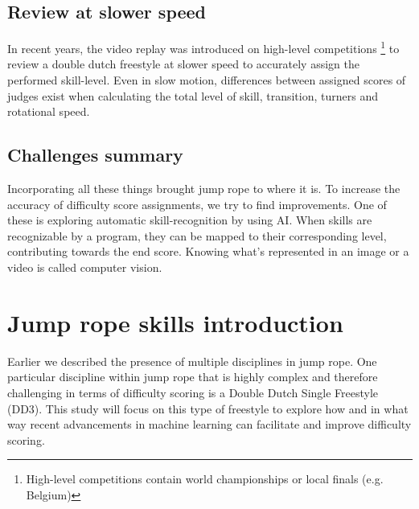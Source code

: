 \subsection{Review at slower speed}
\label{lit:review-at-slower-speed}
In recent years, the video replay was introduced on high-level competitions \footnote{High-level competitions contain world championships or local finals (e.g. Belgium)} to review a double dutch freestyle at slower speed to accurately assign the performed skill-level.
Even in slow motion, differences between assigned scores of judges exist when calculating the total level of skill, transition, turners and rotational speed.

\subsection{Challenges summary}
\label{lit:challenges-summary}
Incorporating all these things brought jump rope to where it is. To increase the accuracy of difficulty score assignments, we try to find improvements. One of these is exploring automatic skill-recognition by using AI. When skills are recognizable by a program, they can be mapped to their corresponding level, contributing towards the end score. Knowing what's represented in an image or a video is called computer vision. %

\section{Jump rope skills introduction}
\label{lit:jump-rope-skills-introduction}

Earlier we described the presence of multiple disciplines in jump rope. One particular discipline within jump rope that is highly complex and therefore challenging in terms of difficulty scoring is a Double Dutch Single Freestyle (DD3). This study will focus on this type of freestyle to explore how and in what way recent advancements in machine learning can facilitate and improve difficulty scoring.

\medskip



